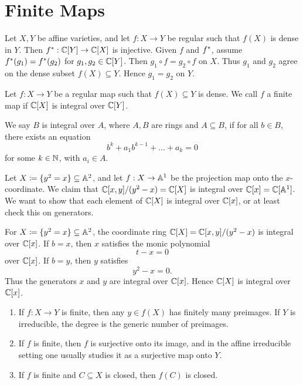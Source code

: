 
\section{Finite Maps}

\begin{proposition}{
    Let $X,Y$ be affine varieties, and let $f: X\to Y$ be regular such that $f(X)$ is dense in $Y$.
    Then $f\upstar:\c[Y]\to\c[X]$ is injective.
}
    Given $f$ and $f\upstar$, assume $f\upstar(g_1) = f\upstar(g_2)$ for $g_1,g_2\in\c[Y]$.
    Then $g_1\circ f = g_2\circ f$ on $X$.
    Thus $g_1$ and $g_2$ agree on the dense subset $f(X)\subseteq Y$.
    Hence $g_1 = g_2$ on $Y$.
\end{proposition}

\begin{definition}
    Let $f : X\to Y$ be a regular map such that $f(X)\subseteq Y$ is dense.
    We call $f$ a finite map if $\c[X]$ is integral over $\c[Y]$.
\end{definition}

\begin{definition}
    We say $B$ is integral over $A$, where $A,B$ are rings and $A\subseteq B$, if for all $b\in B$, there exists an equation
    \[
    b^k + a_1 b^{k-1} + \ldots + a_k = 0
    \]
    for some $k\in\n$, with $a_i\in A$.
\end{definition}

Let $X \coloneqq \{y^2 = x\}\subseteq\aa^2$, and let $f: X\to \aa^1$ be the projection map onto the $x$-coordinate.
We claim that $\c[x,y]/(y^2 - x) = \c[X]$ is integral over $\c[x] = \c[\aa^1]$.
We want to show that each element of $\c[X]$ is integral over $\c[x]$, or at least check this on generators.

\begin{proposition}{
    For $X \coloneqq \{y^2 = x\}\subseteq \aa^2$, the coordinate ring $\c[X] = \c[x,y]/(y^2-x)$ is integral over $\c[x]$.
}
    If $b = x$, then $x$ satisfies the monic polynomial
    \[
    t - x = 0
    \]
    over $\c[x]$.
    If $b = y$, then $y$ satisfies
    \[
    y^2 - x = 0.
    \]
    Thus the generators $x$ and $y$ are integral over $\c[x]$.
    Hence $\c[X]$ is integral over $\c[x]$.
\end{proposition}

\begin{definition}
    \begin{enumerate}
        \item If $f : X\to Y$ is finite, then any $y\in f(X)$ has finitely many preimages.
        If $Y$ is irreducible, the degree is the generic number of preimages.
        \item If $f$ is finite, then $f$ is surjective onto its image, and in the affine irreducible setting one usually studies it as a surjective map onto $Y$.
        \item If $f$ is finite and $C\subseteq X$ is closed, then $f(C)$ is closed.
    \end{enumerate}
\end{definition}